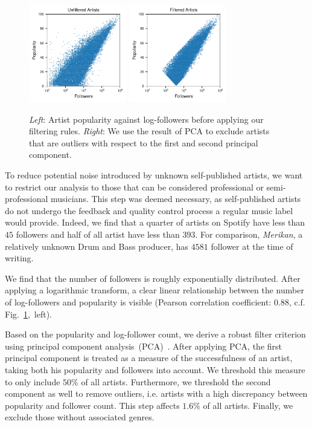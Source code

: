 \documentclass{article}
\begin{document}
\begin{figure}[t]
  \centering
  \includegraphics[width=0.38\textwidth]{../figures/artists_unfiltered.pdf}
  \qquad
  \includegraphics[width=0.38\textwidth]{../figures/artists_filtered.pdf}
  \caption{\textit{Left}: Artist popularity against log-followers before applying our filtering rules. \textit{Right}: We use the result of PCA to exclude artists that are outliers with respect to the first and second principal component.}
  \label{fig:filtering}
\end{figure}

To reduce potential noise introduced by unknown self-published artists, we want to restrict our analysis to those that can be considered professional or semi-professional musicians. This step was deemed necessary, as self-published artists do not undergo the feedback and quality control process a regular music label would provide. Indeed, we find that a quarter of artists on Spotify have less than $45$ followers and half of all artist have less than $393$. For comparison, \emph{Merikan}, a relatively unknown Drum and Bass producer, has $4581$ follower at the time of writing.

We find that the number of followers is roughly exponentially distributed. After applying a logarithmic transform, a clear linear relationship between the number of log-followers and popularity is visible (Pearson correlation coefficient: $0.88$, c.f. Fig.~\ref{fig:filtering},~left). 

Based on the popularity and log-follower count, we derive a robust filter criterion using principal component analysis~(PCA)~\cite{jolliffe2016principal}. After applying PCA, the first principal component is treated as a measure of the successfulness of an artist, taking both his popularity and followers into account. We threshold this measure to only include $50\%$ of all artists. Furthermore, we threshold the second component as well to remove outliers, i.e. artists with a high discrepancy between popularity and follower count. This step affects $1.6\%$ of all artists. Finally, we exclude those without associated genres.
\end{document}
